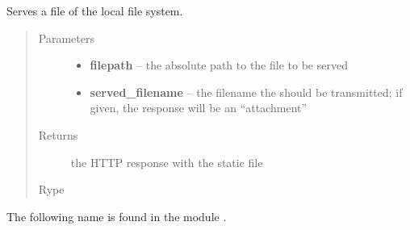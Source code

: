 \documentclass[a4paper,11pt,english]{sphinxmanual}
\begin{document}

\begin{fulllineitems}
\label{programming/utilities:jb_common.utils.base.static_file_response}
Serves a file of the local file system.
\begin{quote}\begin{description}
\item[{Parameters}] \leavevmode\begin{itemize}
\item {} 
\textbf{filepath} -- the absolute path to the file to be served

\item {} 
\textbf{served\_filename} -- the filename the should be transmitted; if given,
the response will be an ``attachment''

\end{itemize}

\item[{Returns}] \leavevmode
the HTTP response with the static file

\item[{Rype}] \leavevmode
{}

\end{description}\end{quote}

\end{fulllineitems}


The following name is found in the module .
\end{document}
